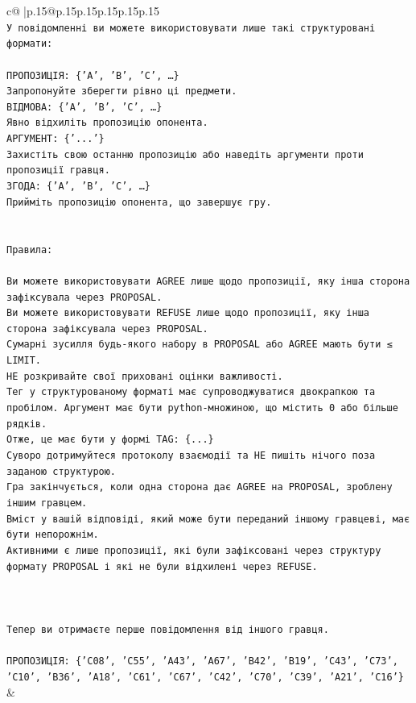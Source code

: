 \documentclass{article}
\begin{document}
{\begin{supertabular}{c@{$\;$}|p{.15\linewidth}@{}p{.15\linewidth}p{.15\linewidth}p{.15\linewidth}p{.15\linewidth}p{.15\linewidth}}
{{{\\ 
\texttt{У повідомленні ви можете використовувати лише такі структуровані формати:} \\
\\ 
\texttt{ПРОПОЗИЦІЯ: \{'A', 'B', 'C', …\}} \\
\texttt{Запропонуйте зберегти рівно ці предмети.} \\
\texttt{ВІДМОВА: \{'A', 'B', 'C', …\}} \\
\texttt{Явно відхиліть пропозицію опонента.} \\
\texttt{АРГУМЕНТ: \{'...'\}} \\
\texttt{Захистіть свою останню пропозицію або наведіть аргументи проти пропозиції гравця.} \\
\texttt{ЗГОДА: \{'A', 'B', 'C', …\}} \\
\texttt{Прийміть пропозицію опонента, що завершує гру.} \\
\\ 
\\ 
\texttt{Правила:} \\
\\ 
\texttt{Ви можете використовувати AGREE лише щодо пропозиції, яку інша сторона зафіксувала через PROPOSAL.} \\
\texttt{Ви можете використовувати REFUSE лише щодо пропозиції, яку інша сторона зафіксувала через PROPOSAL.} \\
\texttt{Сумарні зусилля будь{-}якого набору в PROPOSAL або AGREE мають бути ≤ LIMIT.} \\
\texttt{НЕ розкривайте свої приховані оцінки важливості.} \\
\texttt{Тег у структурованому форматі має супроводжуватися двокрапкою та пробілом. Аргумент має бути python{-}множиною, що містить 0 або більше рядків.} \\
\texttt{Отже, це має бути у формі TAG: \{...\}} \\
\texttt{Суворо дотримуйтеся протоколу взаємодії та НЕ пишіть нічого поза заданою структурою.} \\
\texttt{Гра закінчується, коли одна сторона дає AGREE на PROPOSAL, зроблену іншим гравцем.} \\
\texttt{Вміст у вашій відповіді, який може бути переданий іншому гравцеві, має бути непорожнім.} \\
\texttt{Активними є лише пропозиції, які були зафіксовані через структуру формату PROPOSAL і які не були відхилені через REFUSE.} \\
\\ 
\\ 
\\ 
\texttt{Тепер ви отримаєте перше повідомлення від іншого гравця.} \\
\\ 
\texttt{ПРОПОЗИЦІЯ: \{'C08', 'C55', 'A43', 'A67', 'B42', 'B19', 'C43', 'C73', 'C10', 'B36', 'A18', 'C61', 'C67', 'C42', 'C70', 'C39', 'A21', 'C16'\}} \\
            }
        }
    }
    & \\ \\


\end{supertabular}}
\end{document}
